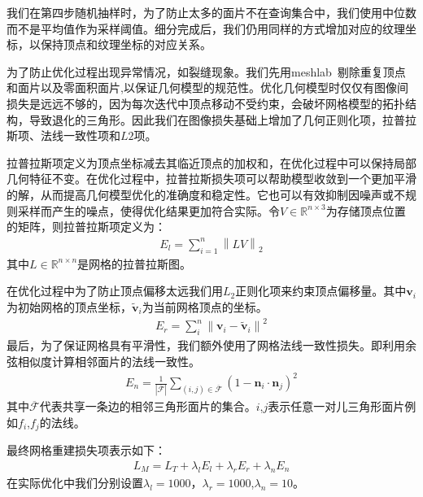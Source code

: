 我们在第四步随机抽样时，为了防止太多的面片不在查询集合中，我们使用中位数而不是平均值作为采样阈值。细分完成后，我们仍用同样的方式增加对应的纹理坐标，以保持顶点和纹理坐标的对应关系。\par
为了防止优化过程出现异常情况，如裂缝现象。我们先用meshlab~\cite{LocalChapterEvents:ItalChap:ItalianChapConf2008:129-136}剔除重复顶点和面片以及零面积面片,以保证几何模型的规范性。优化几何模型时仅仅有图像间损失是远远不够的，因为每次迭代中顶点移动不受约束，会破坏网格模型的拓扑结构，导致退化的三角形。因此我们在图像损失基础上增加了几何正则化项，拉普拉斯项、法线一致性项和$L2$项。\par
拉普拉斯项定义为顶点坐标减去其临近顶点的加权和，在优化过程中可以保持局部几何特征不变。在优化过程中，拉普拉斯损失项可以帮助模型收敛到一个更加平滑的解，从而提高几何模型优化的准确度和稳定性。它也可以有效抑制因噪声或不规则采样而产生的噪点，使得优化结果更加符合实际。令$V \in \mathbb{R}^{n\times3}$为存储顶点位置的矩阵，则拉普拉斯项定义为：
\begin{align}
	E_l = \sum_{i=1}^{n}\left \| LV \right \|_2 
\end{align}
其中$L\in\mathbb{R}^{n\times n} $是网格的拉普拉斯图。\par
在优化过程中为了防止顶点偏移太远我们用$L_2$正则化项来约束顶点偏移量。其中$\mathbf{v}_{i}$为初始网格的顶点坐标，$\widetilde{\mathbf{v}}_{i}$为当前网格顶点的坐标。
\begin{align}
	E_{r}=\sum_{i}^{n}\left\|\mathbf{v}_{i}-\widetilde{\mathbf{v}}_{i}\right\|^{2}
\end{align}
最后，为了保证网格具有平滑性，我们额外使用了网格法线一致性损失。即利用余弦相似度计算相邻面片的法线一致性。
\begin{align}
	E_n= \frac{1}{|\overline{\mathcal{F}}|} \sum_{(i, j) \in \overline{\mathcal{F}}}\left(1-\mathbf{n}_{i} \cdot \mathbf{n}_{j}\right)^{2}
\end{align}
其中$\overline{\mathcal{F}}$代表共享一条边的相邻三角形面片的集合。$i$,$j$表示任意一对儿三角形面片例如$f_i$,$f_j$的法线。\par
最终网格重建损失项表示如下：
\begin{align}
	L_M = L_T + \lambda_l E_l +\lambda_r E_r+\lambda_n E_n
\end{align}
在实际优化中我们分别设置$\lambda_l = 1000$，$\lambda_r = 1000$,$\lambda_n = 10$。
